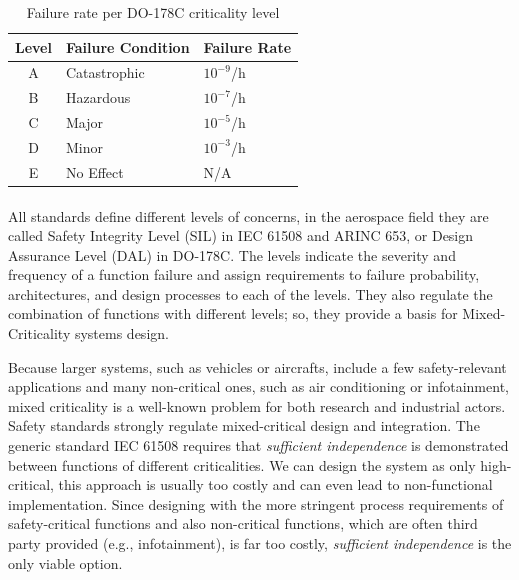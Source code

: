 \begin{table}
\begin{center}
\begin{tabular}{cll}  
\toprule
Level & Failure Condition  & Failure Rate \\
\midrule
A & Catastrophic & $10^{-9}$/h \\
B & Hazardous 	 & $10^{-7}$/h \\
C & Major 		 & $10^{-5}$/h \\
D & Minor 		 & $10^{-3}$/h \\
E & No Effect 	 & N/A \\
\bottomrule
\end{tabular}
\caption {Failure rate per DO-178C criticality level}
\label{tab:DAL}
\end{center}
\end{table}

\paragraph{} All standards define different levels of concerns, in the aerospace field they are called Safety Integrity Level (SIL) in IEC 61508 and ARINC 653, or Design Assurance Level (DAL) in DO-178C. The levels indicate the severity and frequency of a function failure and assign requirements to failure probability, architectures, and design processes to each of the levels. They also regulate the combination of functions with different levels; so, they provide a basis for Mixed-Criticality systems design.
\par Because larger systems, such as vehicles or aircrafts, include a few safety-relevant applications and many non-critical ones, such as air conditioning or infotainment, mixed criticality is a well-known problem for both research and industrial actors. Safety standards strongly regulate mixed-critical design and integration. The generic standard IEC 61508 requires that \emph{sufficient independence} is demonstrated between functions of different criticalities. We can design the system as only high-critical, this approach is usually too costly and can even lead to non-functional implementation. Since designing with the more stringent process requirements of safety-critical functions and also non-critical functions, which are often third party provided (e.g., infotainment), is far too costly, \emph{sufficient independence} is the only viable option. 


